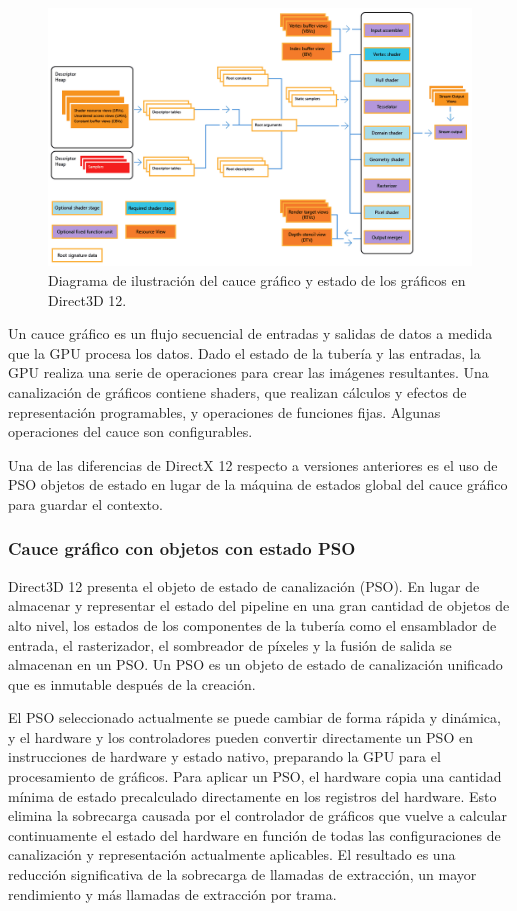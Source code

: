 \documentclass[a4paper, 17pt]{book}
\begin{document}
\begin{figure}[hbt!]
    \centering
    \includegraphics[scale=0.40, keepaspectratio]{img/pipelined123d.png}
    \caption{Diagrama de ilustración del cauce gráfico y estado de los gráficos en Direct3D 12.}
    \label{figura:khronos}
\end{figure}

Un cauce gráfico es un flujo secuencial de entradas y salidas de datos a medida que la GPU procesa los datos.
Dado el estado de la tubería y las entradas, la GPU realiza una serie de operaciones para crear las imágenes resultantes.
Una canalización de gráficos contiene shaders, que realizan cálculos y efectos de representación programables, y operaciones
de funciones fijas. Algunas operaciones del cauce son configurables. 

Una de las diferencias de DirectX 12 respecto a versiones anteriores es el uso de PSO objetos de estado en lugar de la
máquina de estados global del cauce gráfico para guardar el contexto.

\subsubsection{Cauce gráfico con objetos con estado PSO} 
\label{subsubsec:PSO}

Direct3D 12 presenta el objeto de estado de canalización (PSO). En lugar de almacenar y representar el estado del pipeline
en una gran cantidad de objetos de alto nivel, los estados de los componentes de la tubería como el ensamblador de entrada,
el rasterizador, el sombreador de píxeles y la fusión de salida se almacenan en un PSO. Un PSO es un objeto de estado de
canalización unificado que es inmutable después de la creación. 

El PSO seleccionado actualmente se puede cambiar de forma rápida y dinámica, y el hardware y los controladores pueden
convertir directamente un PSO en instrucciones de hardware y estado nativo, preparando la GPU para el procesamiento
de gráficos. Para aplicar un PSO, el hardware copia una cantidad mínima de estado precalculado directamente en los
registros del hardware. Esto elimina la sobrecarga causada por el controlador de gráficos que vuelve a calcular
continuamente el estado del hardware en función de todas las configuraciones de canalización y representación actualmente
aplicables. El resultado es una reducción significativa de la sobrecarga de llamadas de extracción, un mayor rendimiento
y más llamadas de extracción por trama.
\end{document}
